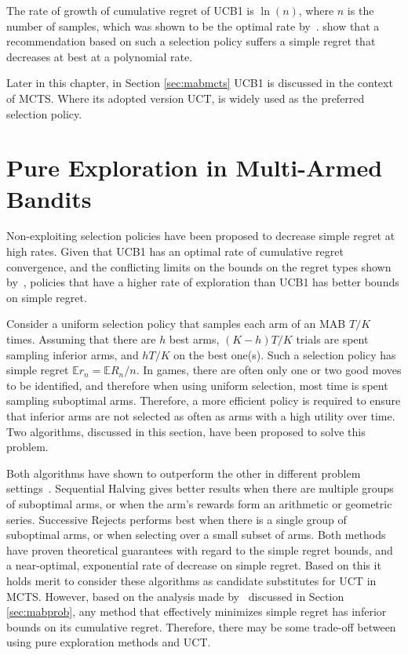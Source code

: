 \documentclass{kecsmstr}
\newcommand{\bE}{\mathbb{E}}
\begin{document}
The rate of growth of cumulative regret of UCB1 is $\ln(n)$, where $n$ is the number of samples, which was shown to be the optimal rate by~.  show that a recommendation based on such a selection policy suffers a simple regret that decreases at best at a polynomial rate. 

Later in this chapter, in Section \ref{sec:mabmcts} UCB1 is discussed in the context of MCTS. Where its adopted version UCT, is widely used as the preferred selection policy.
\newpage
\section{Pure Exploration in Multi-Armed Bandits}
\label{sec:pureexplmab}
Non-exploiting selection policies have been proposed to decrease simple regret at high rates. Given that UCB1 has an optimal rate of cumulative regret convergence, and the conflicting limits on the bounds on the regret types shown by~, policies that have a higher rate of exploration than UCB1 has better bounds on simple regret. 

Consider a uniform selection policy that samples each arm of an MAB $T/K$ times. Assuming that there are $h$ best arms, $(K-h)T/K$ trials are spent sampling inferior arms, and $hT/K$ on the best one(s). Such a selection policy has simple regret $\bE r_n = \bE R_n/n$.
In games, there are often only one or two good moves to be identified, and therefore when using uniform selection, most time is spent sampling suboptimal arms. Therefore, a more efficient policy is required to ensure that inferior arms are not selected as often as arms with a high utility over time. Two algorithms, discussed in this section, have been proposed to solve this problem.

Both algorithms have shown to outperform the other in different problem settings~. Sequential Halving gives better results when there are multiple groups of suboptimal arms, or when the arm's rewards form an arithmetic or geometric series. Successive Rejects performs best when there is a single group of suboptimal arms, or when selecting over a small subset of arms. Both methods have proven theoretical guarantees with regard to the simple regret bounds, and a near-optimal, exponential rate of decrease on simple regret. Based on this it holds merit to consider these algorithms as candidate substitutes for UCT in MCTS. However, based on the analysis made by~ discussed in Section \ref{sec:mabprob}, any method that effectively minimizes simple regret has inferior bounds on its cumulative regret. Therefore, there may be some trade-off between using pure exploration methods and UCT.
\newpage
\end{document}
